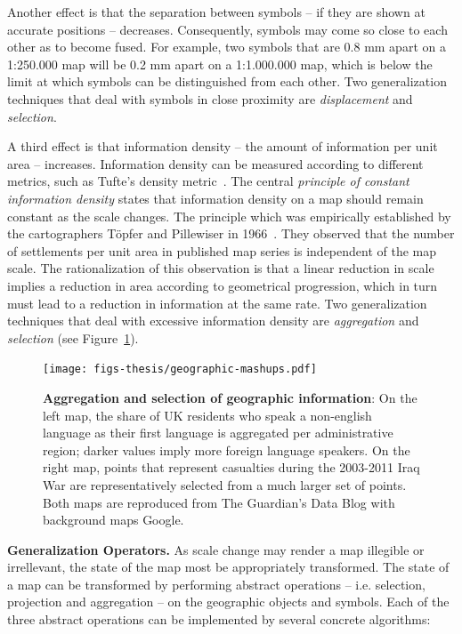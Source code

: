 \documentclass[11pt, oneside]{report}
\newcommand{\minisec}[1]{\noindent\textbf{#1.}}
\begin{document}
{Another effect is that the separation between symbols -- if they are shown at accurate positions -- decreases. Consequently, symbols may come so close to each other as to become fused. For example, two symbols that are 0.8 mm apart on a 1:250.000 map will be 0.2 mm apart on a 1:1.000.000 map, which is below the limit at which symbols can be distinguished from each other. Two generalization techniques that deal with symbols in close proximity are \emph{displacement} and \emph{selection}.


A third effect is that information density --  the amount of information per unit area --  increases. Information density can be measured according to different metrics, such as Tufte's density metric~\cite{tufte1983visual}. The central \emph{principle of constant information density} states that information density on a map should remain constant as the scale changes. The principle which was empirically established by the cartographers T{\"o}pfer and Pillewiser in 1966~\cite{topfer1966principles}. They observed that the number of settlements per unit area in published map series is independent of the map scale. The rationalization of this observation is that a linear reduction in scale implies a reduction in area according to geometrical progression, which in turn must lead to a reduction in information at the same rate. Two generalization techniques that deal with excessive information density are \emph{aggregation} and \emph{selection} (see Figure~\ref{fig:introduction:background:mashups}).

\begin{figure}[htbp]
\begin{center}
\texttt{[image: figs-thesis/geographic-mashups.pdf]}
\caption{\textbf{Aggregation and selection of geographic information}: On the left map, the share of UK residents who speak a non-english language as their first language is aggregated per administrative region; darker values imply more foreign language speakers. On the right map, points that represent casualties during the 2003-2011 Iraq War are representatively selected from a much larger set of points. Both maps are reproduced from The Guardian's Data Blog with background maps  Google.}
\label{fig:introduction:background:mashups}
\end{center}
\end{figure}

\minisec{Generalization Operators}
As scale change may render a map illegible or irrellevant, the state of the map most be appropriately transformed. The state of a map can be transformed by performing abstract operations -- i.e. selection, projection and aggregation -- on the geographic objects and symbols. Each of the three abstract operations can be implemented by several concrete algorithms:

}
\end{document}
